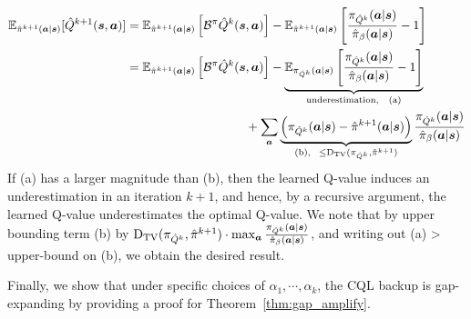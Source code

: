\begin{align*}
    \mathbb{E}_{\hat{\pi}^{k+1}(\boldsymbol{a}|\boldsymbol{s})}[\hat{Q}^{k+1}(\boldsymbol{s}, \boldsymbol{a})] &=  \mathbb{E}_{\hat{\pi}^{k+1}(\boldsymbol{a}|\boldsymbol{s})}\left[ \mathcal{B}^\pi \hat{Q}^k (\boldsymbol{s}, \boldsymbol{a}) \right] - \mathbb{E}_{\hat{\pi}^{k+1}(\boldsymbol{a}|\boldsymbol{s})}\left[ \frac{\pi_{\hat{Q}^k}(\boldsymbol{a} | \boldsymbol{s})}{\hat{\pi}_\beta(\boldsymbol{a}|\boldsymbol{s})} -1 \right]\\
    &= \mathbb{E}_{\hat{\pi}^{k+1}(\boldsymbol{a}|\boldsymbol{s})}\left[ \mathcal{B}^\pi \hat{Q}^k (\boldsymbol{s}, \boldsymbol{a}) \right] - \underbrace{\mathbb{E}_{\pi_{\hat{Q}^k}(\boldsymbol{a} | \boldsymbol{s})}\left[ \frac{\pi_{\hat{Q}^k}(\boldsymbol{a} | \boldsymbol{s})}{\hat{\pi}_\beta(\boldsymbol{a}|\boldsymbol{s})} -1 \right]}_{\text{underestimation, ~~(a)}}\\
    &~~~~~~~~~~~~~~~~~~~~~~~~~~~~~+ \sum_{\boldsymbol{a}} \underbrace{\left(\pi_{\hat{Q}^k}(\boldsymbol{a} | \boldsymbol{s}) - \hat{\pi}^{k+1}(\boldsymbol{a}|\boldsymbol{s}) \right)}_{\text{(b),}~~{\leq \mathrm{D_{TV}}(\pi_{\hat{Q}^k}, \hat{\pi}^{k+1})}} \frac{\pi_{\hat{Q}^k}(\boldsymbol{a} | \boldsymbol{s})}{\hat{\pi}_\beta(\boldsymbol{a}|\boldsymbol{s})}
\end{align*}
If (a) has a larger magnitude than (b), then the learned Q-value induces an underestimation in an iteration $k+1$, and hence, by a recursive argument, the learned Q-value underestimates the optimal Q-value. We note that by upper bounding term (b) by $\mathrm{D_{TV}}(\pi_{\hat{Q}^k}, \hat{\pi}^{k+1}) \cdot \max_{\boldsymbol{a}} \frac{\pi_{\hat{Q}^k}(\boldsymbol{a} | \boldsymbol{s})}{\hat{\pi}_\beta(\boldsymbol{a}|\boldsymbol{s})}$, and writing out (a) > upper-bound on (b), we obtain the desired result.


Finally, we show that under specific choices of $\alpha_1, \cdots, \alpha_k$, the CQL backup is gap-expanding by providing a proof for Theorem~\ref{thm:gap_amplify}.

